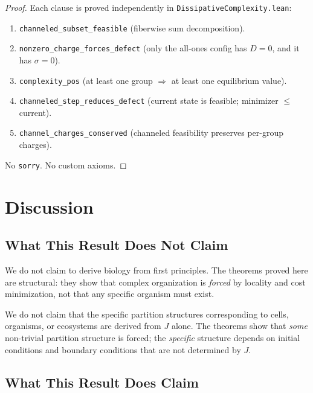 \documentclass[11pt,a4paper]{article}
\theoremstyle{plain}
\theoremstyle{definition}
\theoremstyle{remark}
\newcommand{\Jcost}{J}
\begin{document}
\begin{proof}
Each clause is proved independently in \texttt{DissipativeComplexity.lean}:
\begin{enumerate}[nosep,label=(\roman*)]
\item \texttt{channeled\_subset\_feasible} (fiberwise sum decomposition).
\item \texttt{nonzero\_charge\_forces\_defect} (only the all-ones config has $D = 0$, and it has $\sigma = 0$).
\item \texttt{complexity\_pos} (at least one group $\Rightarrow$ at least one equilibrium value).
\item \texttt{channeled\_step\_reduces\_defect} (current state is feasible; minimizer $\le$ current).
\item \texttt{channel\_charges\_conserved} (channeled feasibility preserves per-group charges).
\end{enumerate}
No \texttt{sorry}.
No custom axioms.
\end{proof}

\section{Discussion}\label{sec:discussion}

\subsection{What This Result Does Not Claim}

We do not claim to derive biology from first principles.
The theorems proved here are structural: they show that complex organization is \emph{forced} by locality and cost minimization, not that any specific organism must exist.

We do not claim that the specific partition structures corresponding to cells, organisms, or ecosystems are derived from $\Jcost$ alone.
The theorems show that \emph{some} non-trivial partition structure is forced; the \emph{specific} structure depends on initial conditions and boundary conditions that are not determined by $\Jcost$.

\subsection{What This Result Does Claim}
\end{document}
